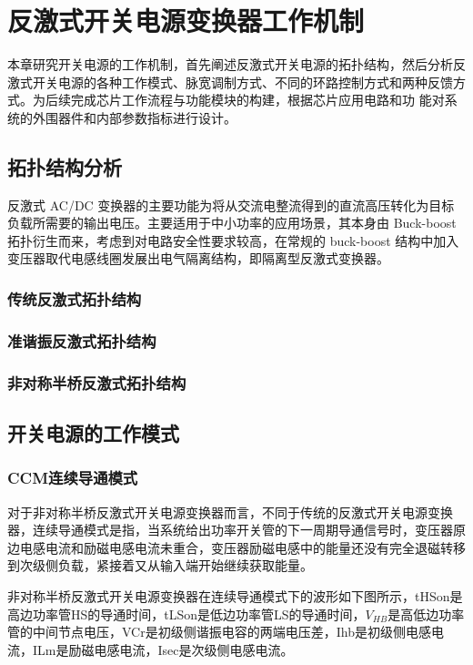 \chapter{反激式开关电源变换器工作机制}
本章研究开关电源的工作机制，首先阐述反激式开关电源的拓扑结构，然后分析反激式开关电源的各种工作模式、脉宽调制方式、不同的环路控制方式和两种反馈方式。为后续完成芯片工作流程与功能模块的构建，根据芯片应用电路和功 能对系统的外围器件和内部参数指标进行设计。

\section{拓扑结构分析}
反激式 AC/DC 变换器的主要功能为将从交流电整流得到的直流高压转化为目标 负载所需要的输出电压。主要适用于中小功率的应用场景，其本身由 Buck-boost 拓扑衍生而来，考虑到对电路安全性要求较高，在常规的 buck-boost 结构中加入变压器取代电感线圈发展出电气隔离结构，即隔离型反激式变换器。
\subsection{传统反激式拓扑结构}

\subsection{准谐振反激式拓扑结构}
                

\subsection{非对称半桥反激式拓扑结构}

\section{开关电源的工作模式}
\label{sec:dataset-build}
\subsection{CCM连续导通模式}
对于非对称半桥反激式开关电源变换器而言，不同于传统的反激式开关电源变换器，连续导通模式是指，当系统给出功率开关管的下一周期导通信号时，变压器原边电感电流和励磁电感电流未重合，变压器励磁电感中的能量还没有完全退磁转移到次级侧负载，紧接着又从输入端开始继续获取能量。

非对称半桥反激式开关电源变换器在连续导通模式下的波形如下图所示，tHSon是高边功率管HS的导通时间，tLSon是低边功率管LS的导通时间，$V_{HB}$是高低边功率管的中间节点电压，VCr是初级侧谐振电容的两端电压差，Ihb是初级侧电感电流，ILm是励磁电感电流，Isec是次级侧电感电流。

